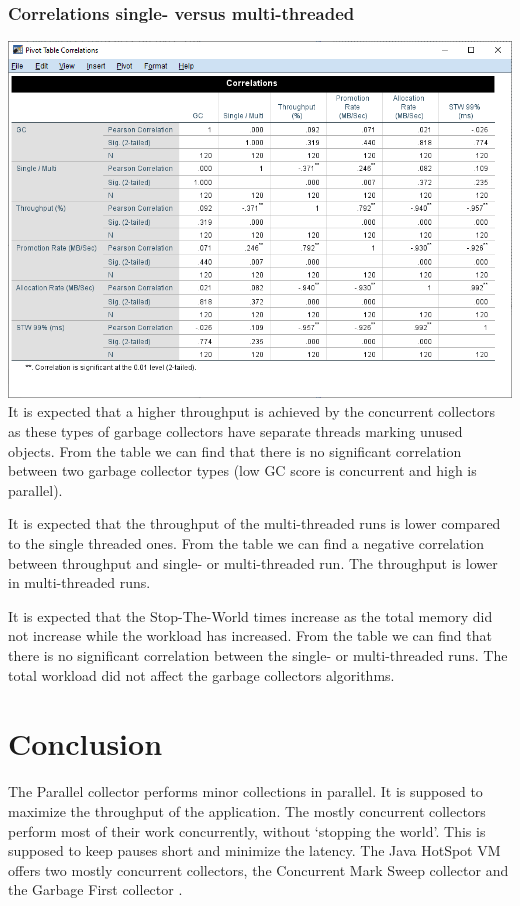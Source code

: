 \documentclass[11pt,a4paper]{article}
\begin{document}
\subsubsection{Correlations single- versus multi-threaded}
\includegraphics[width=\linewidth]{Correlations_single_multi.png}
It is expected that a higher throughput is achieved by the concurrent collectors as these types of garbage collectors have separate threads marking unused objects. From the table we can find that there is no significant correlation between two garbage collector types (low GC score is concurrent and high is parallel).

It is expected that the throughput of the multi-threaded runs is lower compared to the single threaded ones. From the table we can find a negative correlation between throughput and single- or multi-threaded run. The throughput is lower in multi-threaded runs.

It is expected that the Stop-The-World times increase as the total memory did not increase while the workload has increased. From the table we can find that there is no significant correlation between the single- or multi-threaded runs. The total workload did not affect the garbage collectors algorithms.

\newpage
\section{Conclusion}
The Parallel collector performs minor collections in parallel. It is supposed to maximize the throughput of the application. The mostly concurrent collectors perform most of their work concurrently, without `stopping the world'. This is supposed to keep pauses short and minimize the latency. The Java HotSpot VM offers two mostly concurrent collectors, the Concurrent Mark Sweep collector and the Garbage First collector \cite{ORACLE_AVAILABLE}.
\end{document}
